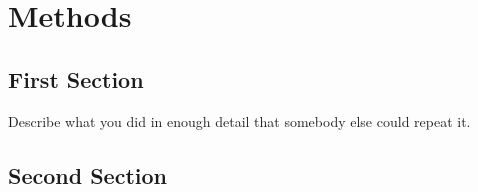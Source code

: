 
\chapter{Methods}\label{chap:methods}

\section{First Section}

Describe what you did in enough detail that somebody else could repeat it.

\lipsum[3][1-5]

\section{Second Section}

\lipsum[4][1-5]
